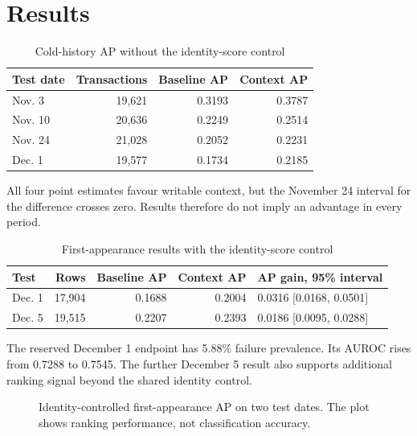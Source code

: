 \documentclass[12pt,a4paper,oneside]{report}
\begin{document}
\section{Results}
\begin{table}[H]\centering\caption{Cold-history AP without the identity-score control}
\begin{tabular}{lrrr}\toprule Test date&Transactions&Baseline AP&Context AP\\\midrule Nov. 3&19,621&0.3193&0.3787\\Nov. 10&20,636&0.2249&0.2514\\Nov. 24&21,028&0.2052&0.2231\\Dec. 1&19,577&0.1734&0.2185\\\bottomrule\end{tabular}\end{table}
All four point estimates favour writable context, but the November 24 interval for the difference crosses zero. Results therefore do not imply an advantage in every period.
\begin{table}[H]\centering\caption{First-appearance results with the identity-score control}
\small\begin{tabularx}{\textwidth}{lrrrY}\toprule Test&Rows&Baseline AP&Context AP&AP gain, 95\% interval\\\midrule Dec. 1&17,904&0.1688&0.2004&0.0316 [0.0168, 0.0501]\\Dec. 5&19,515&0.2207&0.2393&0.0186 [0.0095, 0.0288]\\\bottomrule\end{tabularx}\end{table}
The reserved December 1 endpoint has 5.88\% failure prevalence. Its AUROC rises from 0.7288 to 0.7545. The further December 5 result also supports additional ranking signal beyond the shared identity control.
\begin{figure}[H]\centering
{}
\caption{Identity-controlled first-appearance AP on two test dates. The plot shows ranking performance, not classification accuracy.}
\end{figure}
\end{document}
